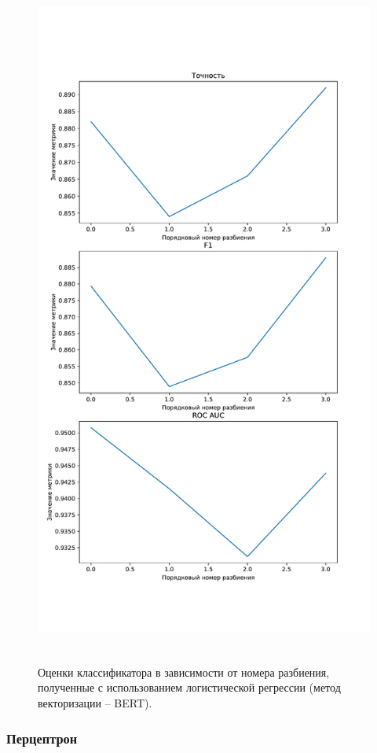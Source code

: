 \begin{figure}[H]
	\centering
	\includegraphics[height=23cm]{inc/plots/logicMetricsBert.pdf}
	\caption{ Оценки классификатора в зависимости от номера разбиения, полученные с использованием логистической регрессии (метод векторизации -- BERT). }
	\label{img:logicMetricsBert}
\end{figure}



\subsubsection{Перцептрон}

